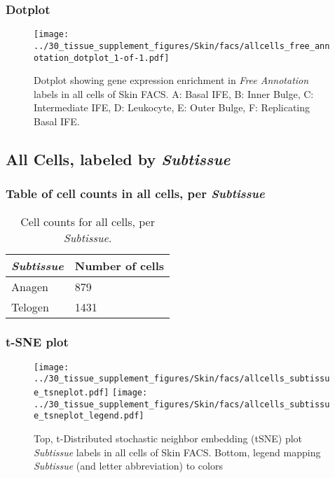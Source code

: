 \clearpage

\subsubsection{Dotplot}
\begin{figure}[h]
\centering
\texttt{[image: ../30\_tissue\_supplement\_figures/Skin/facs/allcells\_free\_annotation\_dotplot\_1-of-1.pdf]}

\caption{ Dotplot  showing gene expression enrichment in \emph{Free Annotation} labels in all cells of Skin FACS. A: Basal IFE, B: Inner Bulge, C: Intermediate IFE, D: Leukocyte, E: Outer Bulge, F: Replicating Basal IFE.}
\end{figure}


\clearpage

\subsection{All Cells, labeled by \emph{Subtissue}}
\subsubsection{Table of cell counts in all cells, per \emph{Subtissue}}\begin{table}[h]
\centering
\label{my-label}
\begin{tabular}{@{}ll@{}}
\toprule

\emph{Subtissue}& Number of cells \\ \midrule
Anagen & 879 \\

Telogen & 1431 \\
\bottomrule
\end{tabular}
\caption{Cell counts for all cells, per \emph{Subtissue}.}
\end{table}

\clearpage
\subsubsection{t-SNE plot}
\begin{figure}[h]
\centering
\texttt{[image: ../30\_tissue\_supplement\_figures/Skin/facs/allcells\_subtissue\_tsneplot.pdf]}
\texttt{[image: ../30\_tissue\_supplement\_figures/Skin/facs/allcells\_subtissue\_tsneplot\_legend.pdf]}
\caption{Top, t-Distributed stochastic neighbor embedding (tSNE) plot  \emph{Subtissue} labels in all cells of Skin FACS. Bottom, legend mapping \emph{Subtissue} (and letter abbreviation) to colors}
\end{figure}


